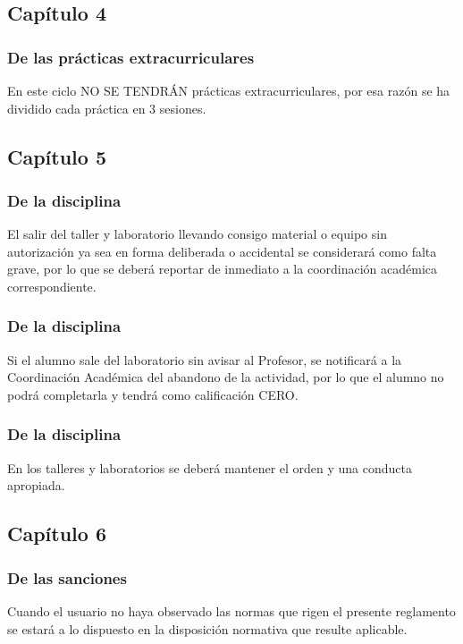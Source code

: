 \documentclass[14pt]{beamer}
\begin{document}
\subsection{Capítulo 4}

\begin{frame}
\frametitle{De las prácticas extracurriculares}
En este ciclo NO SE TENDRÁN prácticas extracurriculares, por esa razón se ha dividido cada práctica en 3 sesiones.
\end{frame}

\subsection{Capítulo 5}

\begin{frame}
\frametitle{De la disciplina}
 El salir del taller y laboratorio llevando consigo material o equipo sin autorización ya sea en forma deliberada o accidental se considerará como falta grave, por lo que se deberá reportar de inmediato a la coordinación académica correspondiente.
\end{frame}
\begin{frame}
\frametitle{De la disciplina}
Si el alumno sale del laboratorio sin avisar al Profesor, se notificará a la Coordinación Académica del abandono de la actividad, por lo que el alumno no podrá completarla y tendrá como calificación CERO.
\end{frame}
\begin{frame}
\frametitle{De la disciplina}
 En los talleres y laboratorios se deberá mantener el orden y una conducta apropiada.
\end{frame}

\subsection{Capítulo 6}

\begin{frame}
\frametitle{De las sanciones}
 Cuando el usuario no haya observado las normas que rigen el presente reglamento se estará a lo dispuesto en la disposición normativa que resulte aplicable.
\end{frame}
\end{document}
